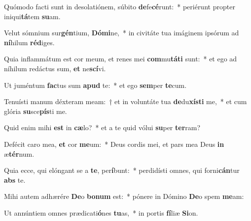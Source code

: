 \item Quómodo facti sunt in desolatiónem, súbito \textbf{de}fe\textbf{cé}runt:~* periérunt propter iniqui\textbf{tá}tem \textbf{su}am.
\item Velut sómnium sur\textbf{gén}tium, \textbf{Dó}\textbf{mi}ne,~* in civitáte tua imáginem ipsórum ad \textbf{ní}hilum \textbf{réd}iges.
\item Quia inflammátum est cor meum, et renes mei \textbf{com}mu\textbf{tá}\textbf{ti} sunt:~* et ego ad níhilum redáctus sum, \textbf{et} ne\textbf{scí}vi.
\item Ut juméntum \textbf{fac}tus sum \textbf{a}\textbf{pud} te:~* et ego \textbf{sem}per \textbf{te}cum.
\item Tenuísti manum déxteram meam:~† et in voluntáte tua \textbf{de}du\textbf{xís}\textbf{ti} me,~* et cum glória \textbf{su}sce\textbf{pís}ti me.
\item Quid enim mihi \textbf{est} in \textbf{cæ}lo?~* et a te quid vólui \textbf{su}per \textbf{ter}ram?
\item Defécit caro mea, \textbf{et} cor \textbf{me}um:~* Deus cordis mei, et pars mea Deus \textbf{in} æ\textbf{tér}num.
\item Quia ecce, qui elóngant se a \textbf{te}, per\textbf{í}bunt:~* perdidísti omnes, qui forni\textbf{cán}tur \textbf{abs} te.
\item Mihi autem adhærére \textbf{De}o \textbf{bo}\textbf{num} est:~* pónere in Dómino \textbf{De}o spem \textbf{me}am:
\item Ut annúntiem omnes prædicati\textbf{ó}nes \textbf{tu}as,~* in portis \textbf{fí}liæ \textbf{Si}on.
